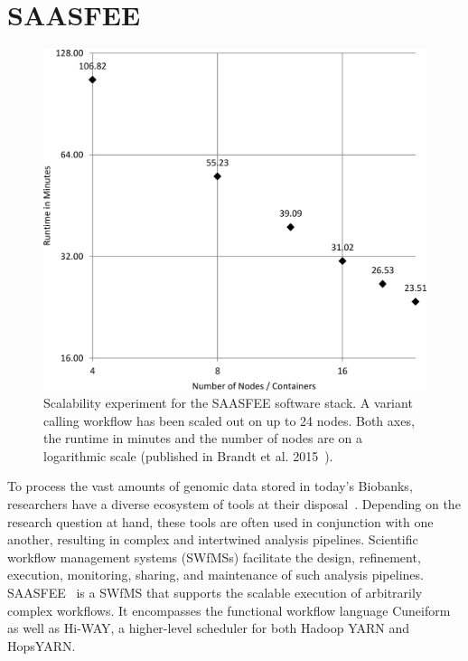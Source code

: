 \section{SAASFEE}
\label{saasfee}

\begin{figure}
  \centering
  \includegraphics[width=.6\textwidth]{imgs/wf_runtime.png}
  \caption{Scalability experiment for the SAASFEE software stack. A variant calling workflow has been scaled out on up to 24 nodes. Both axes, the runtime in minutes and the number of nodes are on a logarithmic scale (published in Brandt et al. 2015~\cite{Brandt2015}).}
  \label{fig:saasfee_scaling}
\end{figure}

To process the vast amounts of genomic data stored in today's Biobanks, researchers have a diverse ecosystem of tools at their disposal~\cite{Pabinger2014}. Depending on the research question at hand, these tools are often used in conjunction with one another, resulting in complex and intertwined analysis pipelines. Scientific workflow management systems (SWfMSs) facilitate the design, refinement, execution, monitoring, sharing, and maintenance of such analysis pipelines. SAASFEE~\cite{vldb_demo} is a SWfMS that supports the scalable execution of arbitrarily complex workflows. It encompasses the functional workflow language Cuneiform as well as Hi-WAY, a higher-level scheduler for both Hadoop YARN and HopsYARN.

